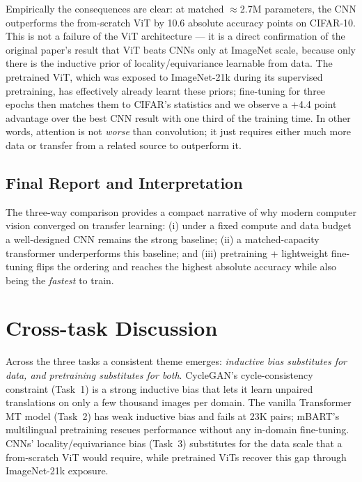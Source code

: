 \documentclass[runningheads]{llncs}
\begin{document}
Empirically the consequences are clear: at matched $\approx$2.7M
parameters, the CNN outperforms the from-scratch ViT by 10.6 absolute
accuracy points on CIFAR-10. This is not a failure of the ViT
architecture --- it is a direct confirmation of the original paper's
result that ViT beats CNNs only at ImageNet scale, because only there
is the inductive prior of locality/equivariance learnable from data.
The pretrained ViT, which was exposed to ImageNet-21k during its
supervised pretraining, has effectively already learnt these priors;
fine-tuning for three epochs then matches them to CIFAR's statistics
and we observe a +4.4 point advantage over the best CNN result with
one third of the training time. In other words, attention is not
\emph{worse} than convolution; it just requires either much more data
or transfer from a related source to outperform it.

\subsection{Final Report and Interpretation}

The three-way comparison provides a compact narrative of why modern
computer vision converged on transfer learning: (i) under a fixed
compute and data budget a well-designed CNN remains the strong
baseline; (ii) a matched-capacity transformer underperforms this
baseline; and (iii) pretraining + lightweight fine-tuning flips the
ordering and reaches the highest absolute accuracy while also being
the \emph{fastest} to train.

\section{Cross-task Discussion}

Across the three tasks a consistent theme emerges: \emph{inductive
bias substitutes for data, and pretraining substitutes for both}.
CycleGAN's cycle-consistency constraint (Task~1) is a strong inductive
bias that lets it learn unpaired translations on only a few thousand
images per domain. The vanilla Transformer MT model (Task~2) has weak
inductive bias and fails at 23K pairs; mBART's multilingual pretraining
rescues performance without any in-domain fine-tuning.
CNNs' locality/equivariance bias (Task~3) substitutes for the data
scale that a from-scratch ViT would require, while pretrained ViTs
recover this gap through ImageNet-21k exposure.
\end{document}
